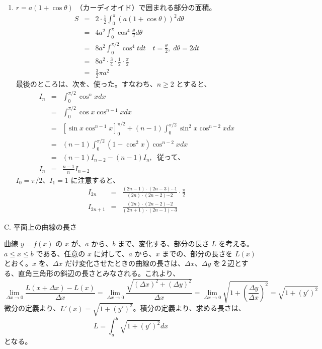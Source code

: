 \begin{eg}
\begin{enumerate}
\item $r = a(1+\cos\theta)$ （カーディオイド）で囲まれる部分の面積。
\begin{eqnarray*}
S & = & 2\cdot \frac12\int_0^\pi (a(1+\cos\theta))^2d\theta\\
   & = & 4a^2\int^\pi_0\cos^4\frac\theta2d\theta\\
   & = & 8a^2\int_0^{\pi/2}\cos^4 tdt\quad t = \frac\theta2, \;d\theta = 2dt\\
   & = & 8a^2\cdot \frac34\cdot\frac12\cdot\frac\pi2\\
   & = & \frac32\pi a^2
\end{eqnarray*}
最後のところは、次を、使った。すなわち、$n\geq 2$ とすると、
\begin{eqnarray*}
I_n & =  & \int_0^{\pi/2}\cos^nxdx\\
     & = & \int_0^{\pi/2}\cos x\cos^{n-1}xdx\\
     & = & [\sin x\cos^{n-1}x]^{\pi/2}_0 + (n-1)\int_0^{\pi/2}\sin^2x\cos^{n-2}xdx\\
     & = & (n-1)\int_0^{\pi/2}(1-\cos^2 x)\cos^{n-2}xdx\\
     & = & (n-1)I_{n-2} - (n-1)I_n, \;\mbox{ 従って、}\\
I_n & = & \frac{n-1}{n} I_{n-2}
\end{eqnarray*}
$I_0 = \pi/2$、$I_1 = 1$ に注意すると、
\begin{eqnarray*}
I_{2n} & = & \frac{(2n-1)\cdot(2n-3)\cdots1}{(2n)\cdot(2n-2)\cdots2}\cdot\frac\pi2\\
I_{2n+1} & = & \frac{(2n)\cdot(2n-2)\cdots2}{(2n+1)\cdot(2n-1)\cdots3}
\end{eqnarray*}
\end{enumerate}
\end{eg}

\bigskip
C. 平面上の曲線の長さ

曲線 $y = f(x)$ の $x$ が、$a$ から、$b$ まで、変化する、部分の長さ $L$ を考える。$a\leq x\leq b$ である、任意の $x$ に対して、$a$ から、$x$ までの、部分の長さを $L(x)$ とおく。$x$ を、$\Delta x$ だけ変化させたときの曲線の長さは、$\Delta x$、$\Delta y$ を２辺とする、直角三角形の斜辺の長さとみなされる。これより、
$$\lim_{\Delta x\to 0}\frac{L(x + \Delta x) - L(x)}{\Delta x} = \lim_{\Delta x\to 0}\frac{\sqrt{(\Delta x)^2 + (\Delta y)^2}}{\Delta x} = \lim_{\Delta x\to 0}\sqrt{1 + \left(\frac{\Delta y}{\Delta x}\right)^2} = \sqrt{1+(y')^2}$$
微分の定義より、$L'(x) = \sqrt{1+(y')^2}$。積分の定義より、求める長さは、
$$L = \int_a^b\sqrt{1+(y')^2}dx$$
となる。

